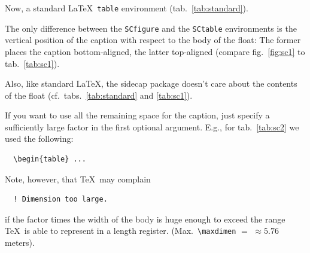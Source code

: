 \documentclass{article}
\begin{document}
\begin{figure}
  \caption[\SHORTCAPi]{\CAPi}
  \label{fig:sc3}
\end{figure}

\clearpage

Now, a standard \LaTeX\ \texttt{table} environment
(tab.~\ref{tab:standard}).

\begin{table}[h]
  \centering
  \caption[\SHORTCAPi]{\CAPi}
  \TABi%
  \label{tab:standard}
\end{table}

The only difference between the \verb|SCfigure| and the
\verb|SCtable| environments is the vertical position of the
caption with respect to the body of the float:
The former places the caption bottom-aligned, the latter top-aligned
(compare fig.~\ref{fig:sc1} to tab.~\ref{tab:sc1}).

Also, like standard \LaTeX, the \textsf{sidecap} package doesn't care
about the contents of the float (cf.\ tabs.~\ref{tab:standard} and
\ref{tab:sc1}).

\begin{table}
  \caption[\SHORTCAPi]{\CAPi}  
  \label{tab:sc1}
\end{table}

If you want to use all the remaining space for the caption, just
specify a sufficiently large factor in the first optional argument.
E.g., for tab.~\ref{tab:sc2} we used the following:
%
\begin{verbatim}
  \begin{table} ...
\end{verbatim}
%
Note, however, that \TeX\ may complain
%
\begin{verbatim}
  ! Dimension too large.
\end{verbatim}
%
if the factor times the width of the body is huge enough to exceed
the range \TeX\ is able to represent in a length register.
%
(Max.\ \verb|\maxdimen|%
${}={}$\the\maxdimen
${}\approx 5.76$\,{meters}).

\begin{table}
\captionsetup{font=,labelfont=sf,textfont=it}
\captionsetup{margin=10pt}
  \caption[]{\CAPi}
  \label{tab:sc2}
\end{table}

\begin{figure}
  \caption*{\CAPi}
\end{figure}
\end{document}
